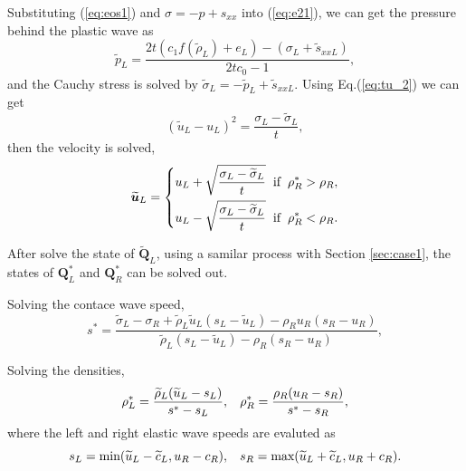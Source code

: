 \documentclass{article}
\numberwithin{equation}{section}
\numberwithin{table}{section}
\begin{document}
Substituting (\ref{eq:eos1}) and $\sigma=-p +s_{xx}$ into (\ref{eq:e21}), we can get the pressure behind the plastic wave as
\begin{equation}
  \widetilde{p}_L= \frac{2t(c_1f(\widetilde{\rho}_L)+e_L)-(\sigma_L+\widetilde{s}_{xxL})}{2tc_0-1},
\end{equation}
and the Cauchy stress is solved by $\widetilde{\sigma}_L = -\widetilde{p}_L+\widetilde{s}_{xxL}$. Using Eq.(\ref{eq:tu_2}) we can get
\begin{equation}
  (\widetilde{u}_L-u_L)^2 = \frac{\sigma_L-\widetilde{\sigma}_L}{t},
\end{equation}
then the velocity is solved,
\begin{equation}
  \widetilde{\bm{u}}_L= \left\{
  \begin{aligned}
	u_L+\sqrt{\frac{\sigma_L-\widetilde{\sigma}_L}{t}} \hspace{0.2cm} \text{if} \hspace{0.2cm} \rho_R^* >\rho_R,\\
	u_L-\sqrt{\frac{\sigma_L-\widetilde{\sigma}_L}{t}} \hspace{0.2cm} \text{if} \hspace{0.2cm} \rho_R^* <\rho_R.\\
\end{aligned} \right.
\end{equation}

After solve the state of $\widetilde{\bm{Q}}_L$,  using a samilar process with Section \ref{sec:case1}, the states of $\bm{Q}_L^*$ and $\bm{Q}_R^*$ can be solved out.

Solving the contace wave speed,
\begin{equation}
  s^* = \frac{\widetilde{\sigma}_L-\sigma_R+\widetilde{\rho}_L \widetilde{u}_L(s_L-\widetilde{u}_L)-\rho_R u_R(s_R-u_R)}{\widetilde{\rho}_L(s_L-\widetilde{u}_L)-\rho_R(s_R-u_R)},
\end{equation}

Solving the densities,
\begin{equation}
  \rho_L^* = \frac{\widetilde{\rho}_L(\widetilde{u}_L-s_L)}{s^*-s_L}, \hspace{0.3cm}  \rho_R^* = \frac{\rho_R(u_R-s_R)}{s^*-s_R},
\end{equation}
where  the left and right  elastic wave speeds are evaluted as
	\begin{equation}
	  s_L = \text{min} (\widetilde{u}_L-\widetilde{c}_L, u_R-c_R), \hspace{0.3cm} s_R = \text{max}(\widetilde{u}_L+\widetilde{c}_L, u_R+c_R).
	\end{equation}
\end{document}

